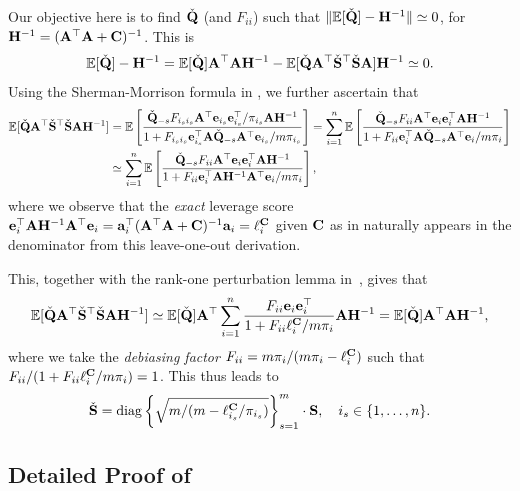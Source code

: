 \documentclass[11pt,a4paper]{article}
\begin{document}
Our objective here is to find $\check{\mathbf{Q}}$ (and $F_{ii}$) such that $\|{\mathbb{E}}[\check{\mathbf{Q}}]-\mathbf{H}^{-1}\|\simeq 0$, for $\mathbf{H}^{-1}= (\mathbf{A}^\top  \mathbf{A} + \mathbf{C})^{-1}$. 
This is
 \begin{align*} 
    {\mathbb{E}}[\check{\mathbf{Q}}]-\mathbf{H}^{-1} = {\mathbb{E}}[\check{\mathbf{Q}}]\mathbf{A}^\top  \mathbf{A}\mathbf{H}^{-1}-{\mathbb{E}}[\check{\mathbf{Q}}\mathbf{A}^\top   \check{\mathbf{S}}^\top \check{\mathbf{S}}\mathbf{A} ]\mathbf{H}^{-1} \simeq 0.
 \end{align*}
Using the Sherman-Morrison formula in , we further ascertain that
 \begin{align}
 {\mathbb{E}}[\check{\mathbf{Q}}\mathbf{A}^\top   \check{\mathbf{S}}^\top \check{\mathbf{S}}\mathbf{A} \mathbf{H}^{-1}]&={\mathbb{E}} \left[\frac{\check{\mathbf{Q}}_{-s}F_{i_si_s}\mathbf{A}^\top\mathbf{e}_{i_s}\mathbf{e}_{i_s}^\top/\pi_{i_s}\mathbf{A}\mathbf{H}^{-1}}{1+F_{i_si_s}\mathbf{e}_{i_s}^\top\mathbf{A}\check{\mathbf{Q}}_{-s}\mathbf{A}^\top\mathbf{e}_{i_s}/m\pi_{i_s}}\right]=\sum^n_{i=1}{\mathbb{E}}\left[\frac{\check{\mathbf{Q}}_{-s}F_{ii}\mathbf{A}^\top\mathbf{e}_{i}\mathbf{e}_{i}^\top\mathbf{A}\mathbf{H}^{-1}}{1+F_{ii}\mathbf{e}_{i}^\top\mathbf{A}\check{\mathbf{Q}}_{-s}\mathbf{A}^\top\mathbf{e}_{i}/m\pi_{i}}\right]\nonumber\\
 & \simeq\sum^n_{i=1}{\mathbb{E}}\left[\frac{\check{\mathbf{Q}}_{-s}F_{ii}\mathbf{A}^\top\mathbf{e}_{i}\mathbf{e}_{i}^\top\mathbf{A}\mathbf{H}^{-1}}{1+F_{ii}\mathbf{e}_{i}^\top\mathbf{A}\mathbf{H}^{-1}\mathbf{A}^\top\mathbf{e}_{i}/m\pi_{i}}\right],\nonumber
 \end{align}
 where we observe that the \emph{exact} leverage score $\mathbf{e}_{i}^\top\mathbf{A}\mathbf{H}^{-1}\mathbf{A}^\top\mathbf{e}_{i} = \mathbf{a}_i^\top (\mathbf{A}^\top  \mathbf{A} + \mathbf{C})^{-1} \mathbf{a}_i = \ell_i^{\mathbf{C}}$ given $\mathbf{C}$ as in  naturally appears in the denominator from this leave-one-out derivation.

This, together with the rank-one perturbation lemma in~\citet[Lemma~2.6]{silverstein1995empirical}, gives that 
\begin{align}
{\mathbb{E}}[\check{\mathbf{Q}}\mathbf{A}^\top   \check{\mathbf{S}}^\top \check{\mathbf{S}}\mathbf{A} \mathbf{H}^{-1}]\simeq {\mathbb{E}}[  \check{\mathbf{Q}}]  \mathbf{A}^\top\sum^n_{i=1}\frac{F_{ii}\mathbf{e}_{i}\mathbf{e}_{i}^\top}{1+F_{ii}\ell^{\mathbf{C}}_i/m\pi_{i}}\mathbf{A}\mathbf{H}^{-1}= {\mathbb{E}}[  \check{\mathbf{Q}}]  \mathbf{A}^\top\mathbf{A}\mathbf{H}^{-1},  \nonumber 
\end{align}
where we take the \emph{debiasing factor} $F_{ii}= m\pi_{i}/( m\pi_{i} - \ell_{i}^{\mathbf{C}} )$ such that $F_{ii}/(1+F_{ii}\ell^{\mathbf{C}}_i/m\pi_{i})=1$.
This thus leads to
 \begin{align}
  \check{\mathbf{S}} =\operatorname{diag} \left\{\sqrt{m/(m-\ell_{i_s}^{\mathbf{C}}/\pi_{i_s})} \right\}^m_{s=1}\cdot\mathbf{S}, \quad i_s\in \{1,\ldots,n\}.\nonumber
\end{align}

 
\subsection{Detailed Proof of }
\label{subsec:detailed_proof_prop:debias}
\end{document}
